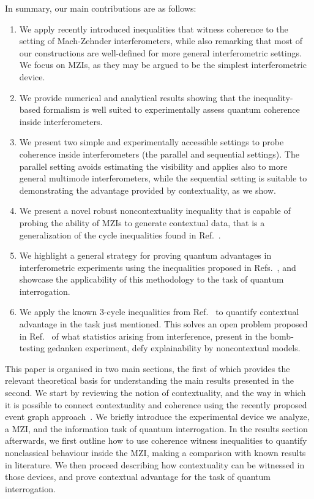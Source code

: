 \documentclass[letterpaper,onecolumn,12pt,accepted=2024-01-17]{article}
\begin{document}
{In summary, our main contributions are as follows: 
\begin{enumerate}
    \item We apply recently introduced inequalities that witness coherence  to the setting of Mach-Zehnder interferometers, while also remarking that most of our constructions are well-defined for more general interferometric settings. We focus on MZIs, as they may be argued to be the simplest interferometric device.
    \item We provide numerical and analytical results showing that the inequality-based formalism is well suited to experimentally assess quantum coherence inside interferometers.
    \item We present two simple and experimentally accessible settings to probe coherence inside interferometers (the parallel and sequential settings). The parallel setting avoids estimating the visibility and applies also to more general multimode interferometers, while the sequential setting is  suitable to demonstrating the advantage provided by contextuality, as we show. 
    \item We present a novel robust noncontextuality inequality that is capable of probing the ability of MZIs to generate contextual data, that is a generalization of the cycle inequalities found in Ref.~\cite{galvaobroad2020quantumandclassical}. %
    \item We highlight a general strategy for proving quantum advantages in interferometric experiments using the inequalities proposed in Refs.~\cite{galvaobroad2020quantumandclassical,wagner2022inequalities}, and showcase the applicability of this methodology to the task of quantum interrogation.
    \item We apply the known $3$-cycle inequalities from Ref.~\cite{galvaobroad2020quantumandclassical} to quantify contextual advantage in the task just mentioned. This solves an open problem proposed in Ref.~\cite{catani2021interference} of what statistics arising from interference, present in the bomb-testing gedanken experiment, defy explainability by noncontextual models. 
\end{enumerate}
}



This paper is organised in two main sections, the first of which provides the relevant theoretical basis for understanding the main results presented in the second. We start by reviewing the notion of contextuality, and the way in which it is possible to connect contextuality and coherence using the recently proposed event graph approach~\cite{wagner2022inequalities}. We briefly introduce the experimental device we analyze, a MZI, and the information task of quantum interrogation. In the results section afterwards, we first outline how to use coherence witness inequalities to quantify nonclassical behaviour inside the MZI, making a comparison with known results in literature. We then proceed describing how contextuality can be witnessed in those devices, and prove contextual advantage for the task of quantum interrogation.
\end{document}
